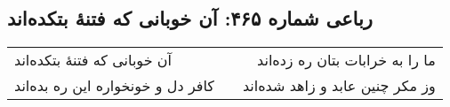 \begin{center}
\section*{رباعی شماره ۴۶۵: آن خوبانی که فتنهٔ بتکده‌اند}
\label{sec:0465}
\begin{longtable}{l p{0.5cm} r}
آن خوبانی که فتنهٔ بتکده‌اند
&&
ما را به خرابات بتان ره زده‌اند
\\
کافر دل و خونخواره این ره بده‌اند
&&
وز مکر چنین عابد و زاهد شده‌اند
\\
\end{longtable}
\end{center}
